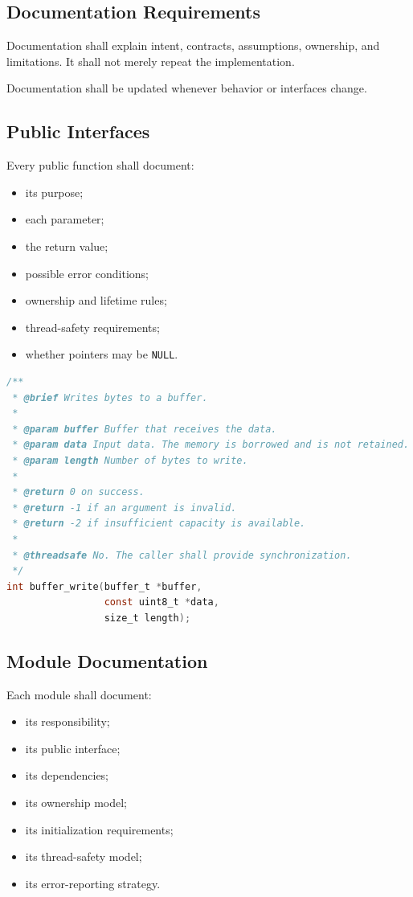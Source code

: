 \subsection{Documentation Requirements}

Documentation shall explain intent, contracts, assumptions, ownership, and limitations. It shall not merely repeat the implementation.

Documentation shall be updated whenever behavior or interfaces change.

\subsection{Public Interfaces}

Every public function shall document:

\begin{itemize}
	\item its purpose;
	\item each parameter;
	\item the return value;
	\item possible error conditions;
	\item ownership and lifetime rules;
	\item thread-safety requirements;
	\item whether pointers may be \texttt{NULL}.
\end{itemize}

\begin{lstlisting}[language=C]
/**
 * @brief Writes bytes to a buffer.
 *
 * @param buffer Buffer that receives the data.
 * @param data Input data. The memory is borrowed and is not retained.
 * @param length Number of bytes to write.
 *
 * @return 0 on success.
 * @return -1 if an argument is invalid.
 * @return -2 if insufficient capacity is available.
 *
 * @threadsafe No. The caller shall provide synchronization.
 */
int buffer_write(buffer_t *buffer,
                 const uint8_t *data,
                 size_t length);
\end{lstlisting}

\subsection{Module Documentation}

Each module shall document:

\begin{itemize}
	\item its responsibility;
	\item its public interface;
	\item its dependencies;
	\item its ownership model;
	\item its initialization requirements;
	\item its thread-safety model;
	\item its error-reporting strategy.
\end{itemize}

